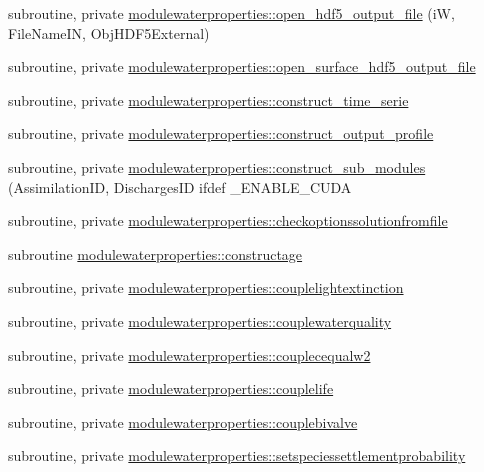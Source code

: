 \begin{DoxyCompactItemize}
\item 
subroutine, private \mbox{\hyperlink{namespacemodulewaterproperties_a20976aef3db724e8f1b9ec39453b5a98}{modulewaterproperties\+::open\+\_\+hdf5\+\_\+output\+\_\+file}} (iW, File\+Name\+IN, Obj\+H\+D\+F5\+External)
\item 
subroutine, private \mbox{\hyperlink{namespacemodulewaterproperties_a947e6ba82bfc1266159800996b8e073c}{modulewaterproperties\+::open\+\_\+surface\+\_\+hdf5\+\_\+output\+\_\+file}}
\item 
subroutine, private \mbox{\hyperlink{namespacemodulewaterproperties_a0067cb435852460b42999329f0637ab7}{modulewaterproperties\+::construct\+\_\+time\+\_\+serie}}
\item 
subroutine, private \mbox{\hyperlink{namespacemodulewaterproperties_a0df2c60cf00ccbb52f0db0aa65924c93}{modulewaterproperties\+::construct\+\_\+output\+\_\+profile}}
\item 
subroutine, private \mbox{\hyperlink{namespacemodulewaterproperties_aef459b24af9c748df5b5fb96dc4292bb}{modulewaterproperties\+::construct\+\_\+sub\+\_\+modules}} (Assimilation\+ID, Discharges\+ID ifdef \+\_\+\+E\+N\+A\+B\+L\+E\+\_\+\+C\+U\+DA
\item 
subroutine, private \mbox{\hyperlink{namespacemodulewaterproperties_a57c8ab92e75b6233d379f6d614bdd148}{modulewaterproperties\+::checkoptionssolutionfromfile}}
\item 
subroutine \mbox{\hyperlink{namespacemodulewaterproperties_ad670c20ce44d68b70fd32aa550c904db}{modulewaterproperties\+::constructage}}
\item 
subroutine, private \mbox{\hyperlink{namespacemodulewaterproperties_a26a4b3541362ed971440672979e6fedb}{modulewaterproperties\+::couplelightextinction}}
\item 
subroutine, private \mbox{\hyperlink{namespacemodulewaterproperties_a2f489eed4fdde73d4aa3ecc3ac0f1ced}{modulewaterproperties\+::couplewaterquality}}
\item 
subroutine, private \mbox{\hyperlink{namespacemodulewaterproperties_a7478a221b172ba61186f09416e5b3b0d}{modulewaterproperties\+::couplecequalw2}}
\item 
subroutine, private \mbox{\hyperlink{namespacemodulewaterproperties_a2568e97ada2e06111796b52ea4b7c50a}{modulewaterproperties\+::couplelife}}
\item 
subroutine, private \mbox{\hyperlink{namespacemodulewaterproperties_ab7e6de4d55639d85393ee68b800ba784}{modulewaterproperties\+::couplebivalve}}
\item 
subroutine, private \mbox{\hyperlink{namespacemodulewaterproperties_a634883e39ff4b721f62c2324303fa3c4}{modulewaterproperties\+::setspeciessettlementprobability}}

\end{DoxyCompactItemize}
